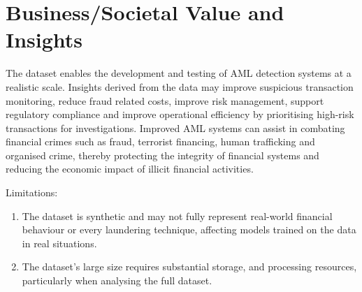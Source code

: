 \section{Business/Societal Value and Insights}

The dataset enables the development and testing of AML detection systems at a realistic scale. Insights derived from the data may improve suspicious transaction monitoring, reduce fraud related costs, improve risk management, support regulatory compliance and improve operational efficiency by prioritising high-risk transactions for investigations. Improved AML systems can assist in combating financial crimes such as fraud, terrorist financing, human trafficking and organised crime, thereby protecting the integrity of financial systems and reducing the economic impact of illicit financial activities.

Limitations: 

\begin{enumerate}
    \item The dataset is synthetic and may not fully represent real-world financial behaviour or every laundering technique, affecting models trained on the data in real situations.
    \item The dataset’s large size requires substantial storage, and processing resources, particularly when analysing the full dataset.
\end{enumerate}
